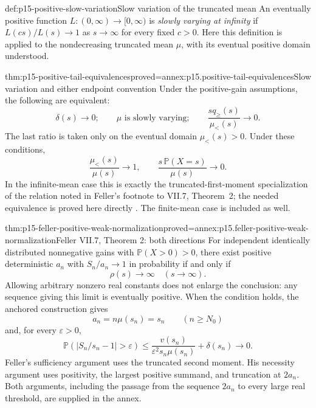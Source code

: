 \begin{hbdefinition}{def:p15-positive-slow-variation}{Slow variation of the truncated mean}
An eventually positive function \(L:(0,\infty)\to[0,\infty)\)
is \emph{slowly varying at infinity} if
\(L(cs)/L(s)\to1\) as \(s\to\infty\) for every fixed \(c>0\).
Here this definition is applied to the nondecreasing truncated
mean \(\mu\), with its eventual positive domain understood.
\end{hbdefinition}

\begin{hbtheorem}{thm:p15-positive-tail-equivalences}{proved=annex:p15.positive-tail-equivalences}{Slow variation and either endpoint convention}
Under the positive-gain assumptions, the following are equivalent:
\[
 \delta(s)\to0;\qquad
 \mu\text{ is slowly varying};\qquad
 \frac{s q_{\geq}(s)}{\mu_<(s)}\to0.
\]
The last ratio is taken only on the eventual domain
\(\mu_<(s)>0\). Under these conditions,
\[
 \frac{\mu_<(s)}{\mu(s)}\to1,\qquad
 \frac{s\,\mathbb P(X=s)}{\mu(s)}\to0.
\]
In the infinite-mean case this is exactly the truncated-first-moment
specialization of the relation noted in Feller's footnote to VII.7,
Theorem~2; the needed equivalence is proved here directly
\cite[pp.~236, 282--284]{Feller1971ProbabilityII}.
The finite-mean case is included as well.
\end{hbtheorem}

\begin{hbtheorem}{thm:p15-feller-positive-weak-normalization}{proved=annex:p15.feller-positive-weak-normalization}{Feller VII.7, Theorem 2: both directions}
For independent identically distributed nonnegative gains with
\(\mathbb P(X>0)>0\), there exist positive deterministic \(a_n\)
with \(S_n/a_n\to1\) in probability if and only if
\[
 \rho(s)\longrightarrow\infty\quad(s\to\infty).
\]
Allowing arbitrary nonzero real constants does not enlarge the
conclusion: any sequence giving this limit is eventually positive.
When the condition holds, the anchored construction gives
\[
 a_n=n\mu(s_n)=s_n\qquad(n\geq N_0)
\]
and, for every \(\varepsilon>0\),
\[
 \mathbb P(|S_n/s_n-1|>\varepsilon)
 \leq \frac{v(s_n)}{\varepsilon^2s_n\mu(s_n)}
                              +\delta(s_n)\longrightarrow0.
\]
Feller's sufficiency argument uses the truncated second moment.
His necessity argument uses positivity, the largest positive
summand, and truncation at \(2a_n\). Both arguments, including the
passage from the sequence \(2a_n\) to every large real threshold,
are supplied in the annex.
\end{hbtheorem}

